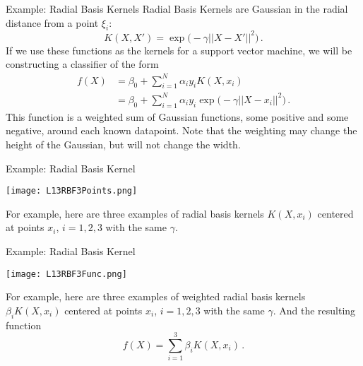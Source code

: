 \documentclass[10pt, table, dvipsnames,xcdraw]{beamer}
\begin{document}
\begin{frame}[fragile]{Example: Radial Basis Kernels}
Radial Basis Kernels are Gaussian in the radial distance from a point $\xi_i$:
$$
K(X,X')=\exp\big(-\gamma||X-X'||^2\big)\,.
$$\pause
If we use these functions as the kernels for a support vector machine, we will be constructing a classifier of the form
\begin{align}
f(X) &= \beta_0+ \sum_{i=1}^N\alpha_iy_i K(X,x_i)
\\
&= \beta_0+ \sum_{i=1}^N\alpha_iy_i \exp\big(-\gamma||X-x_i||^2\big)\,.
\end{align}
This function is a weighted sum of Gaussian functions, some positive and some negative, around each known datapoint. Note that the weighting may change the height of the Gaussian, but will not change the width. 
\end{frame}





\begin{frame}[fragile]{Example: Radial Basis Kernel}
  \begin{minipage}[t][0.6\textheight][t]{\textwidth}
	\centering \texttt{[image: L13RBF3Points.png]}
  \end{minipage}
  \vfill
\begin{minipage}[t][0.4\textheight][t]{\textwidth}
For example, here are three examples of radial basis kernels $K(X,x_i)$ centered at points $x_i$, $i=1,2,3$ with the same $\gamma$.  
\end{minipage}
\end{frame}




\begin{frame}[fragile]{Example: Radial Basis Kernel}
  \begin{minipage}[t][0.6\textheight][t]{\textwidth}
	\centering \texttt{[image: L13RBF3Func.png]}
  \end{minipage}
  \vfill
\begin{minipage}[t][0.4\textheight][t]{\textwidth}
For example, here are three examples of weighted radial basis kernels $\beta_i K(X,x_i)$ centered at points $x_i$, $i=1,2,3$ with the same $\gamma$.  And the resulting function 
$$
f(X) = \sum_{i=1}^3 \beta_i K(X,x_i)\,.
$$
\end{minipage}
\end{frame}
\end{document}
